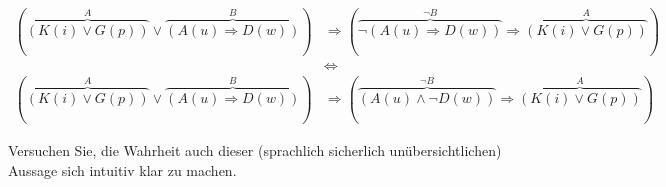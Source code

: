 \begin{align*}
(\overbrace{(K(i) \lor G(p))}^{A} \lor \overbrace{(A(u) \Rightarrow D(w))}^{B}) &\Rightarrow (\overbrace{\lnot (A(u) \Rightarrow D(w))}^{\lnot B} \Rightarrow \overbrace{(K(i) \lor G(p))}^{A}) \\
&\Leftrightarrow \\
(\overbrace{(K(i) \lor G(p))}^{A} \lor \overbrace{(A(u) \Rightarrow D(w))}^{B}) &\Rightarrow (\overbrace{(A(u) \land \lnot D(w))}^{\lnot B} \Rightarrow \overbrace{(K(i) \lor G(p))}^{A})
\end{align*}

Versuchen Sie, die Wahrheit auch dieser (sprachlich sicherlich unübersichtlichen) Aussage sich intuitiv klar zu machen.